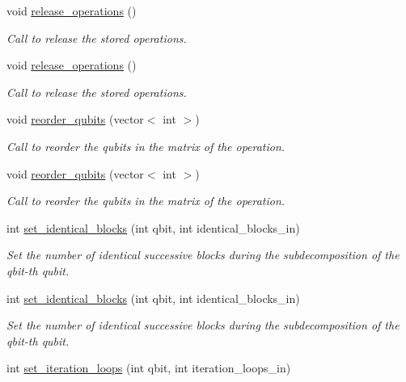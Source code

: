 \begin{DoxyCompactItemize}
void \hyperlink{class_operation__block_a7c3d4eadaef2f21f1c5dd9227faec7ce}{release\+\_\+operations} ()
\begin{DoxyCompactList}\small\item\em Call to release the stored operations. \end{DoxyCompactList}\item 
void \hyperlink{class_operation__block_a7c3d4eadaef2f21f1c5dd9227faec7ce}{release\+\_\+operations} ()
\begin{DoxyCompactList}\small\item\em Call to release the stored operations. \end{DoxyCompactList}\item 
void \hyperlink{class_operation__block_af2a71d29cdbce498e85f11b9ed81e0c9}{reorder\+\_\+qubits} (vector$<$ int $>$)
\begin{DoxyCompactList}\small\item\em Call to reorder the qubits in the matrix of the operation. \end{DoxyCompactList}\item 
void \hyperlink{class_operation__block_af2a71d29cdbce498e85f11b9ed81e0c9}{reorder\+\_\+qubits} (vector$<$ int $>$)
\begin{DoxyCompactList}\small\item\em Call to reorder the qubits in the matrix of the operation. \end{DoxyCompactList}\item 
int \hyperlink{class_sub___matrix___decomposition_a05944754b07d6b5ec16b6febbc79c1a9}{set\+\_\+identical\+\_\+blocks} (int qbit, int identical\+\_\+blocks\+\_\+in)
\begin{DoxyCompactList}\small\item\em Set the number of identical successive blocks during the subdecomposition of the qbit-\/th qubit. \end{DoxyCompactList}\item 
int \hyperlink{class_sub___matrix___decomposition_a05944754b07d6b5ec16b6febbc79c1a9}{set\+\_\+identical\+\_\+blocks} (int qbit, int identical\+\_\+blocks\+\_\+in)
\begin{DoxyCompactList}\small\item\em Set the number of identical successive blocks during the subdecomposition of the qbit-\/th qubit. \end{DoxyCompactList}\item 
int \hyperlink{class_decomposition___base_aaf2862ee2211dac36242551340190b4b}{set\+\_\+iteration\+\_\+loops} (int qbit, int iteration\+\_\+loops\+\_\+in)

\end{DoxyCompactItemize}
